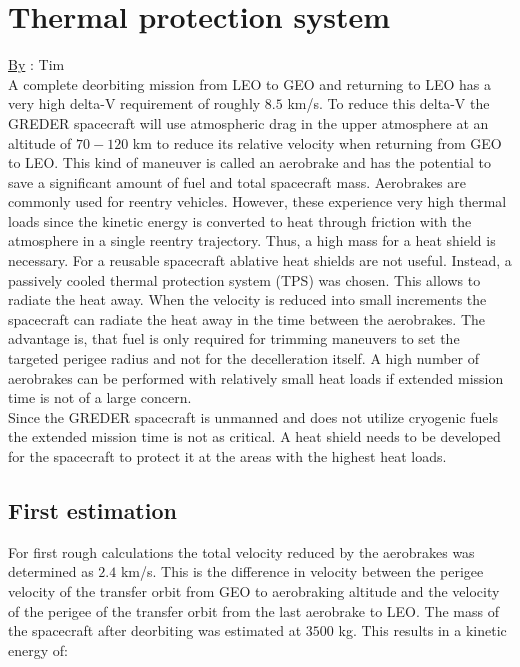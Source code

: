 \chapter{Thermal protection system}
\qquad \underline{By} : Tim\\
\label{chap:5}
A complete deorbiting mission from LEO to GEO and returning to LEO has a very high delta-V requirement of  roughly $8.5$ km/s. To reduce this delta-V the GREDER spacecraft will use atmospheric drag in the upper atmosphere at an altitude of $70-120$ km to reduce its relative velocity when returning from GEO to LEO. This kind of maneuver is called an aerobrake and has the potential to save a significant amount of fuel and total spacecraft mass. Aerobrakes are commonly used for reentry vehicles. However, these experience very high thermal loads since the kinetic energy is converted to heat through friction with the atmosphere in a single reentry trajectory. Thus, a high mass for a heat shield is necessary. For a reusable spacecraft ablative heat shields are not useful. Instead, a passively cooled thermal protection system (TPS) was chosen. This allows to radiate the heat away. When the velocity is reduced into small increments the spacecraft can radiate the heat away in the time between the aerobrakes. The advantage is, that fuel is only required for trimming maneuvers to set the targeted perigee radius and not for the decelleration itself. A high number of aerobrakes can be performed with relatively small heat loads if extended mission time is not of a large concern.\\

Since the GREDER spacecraft is unmanned and does not utilize cryogenic fuels the extended mission time is not as critical. A heat shield needs to be developed for the spacecraft to protect it at the areas with the highest heat loads.

\section{First estimation}

\qquad For first rough calculations the total velocity reduced by the aerobrakes was determined as $2.4$ km/s. This is the difference in velocity between the perigee velocity of the transfer orbit from GEO to aerobraking altitude and the velocity of the perigee of the transfer orbit from the last aerobrake to LEO. The mass of the spacecraft after deorbiting was estimated at $3500$ kg. This results in a kinetic energy of:

